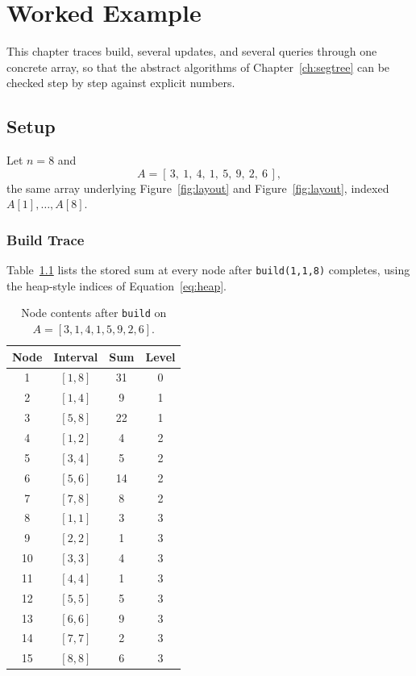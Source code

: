 \documentclass[
  11pt,
  a4paper,
  twoside=false,
  numbers=noenddot,
  headings=big,
  parskip=half,
  toc=bibliography,
  toc=listof,
  bibliography=totoc
]{scrreprt}
\newcounter{example}[chapter]
\newcommand{\tblhead}[1]{\textbf{\sffamily #1}}
\begin{document}
\chapter{Worked Example}
\label{ch:worked-example}

This chapter traces build, several updates, and several queries through one concrete array, so that the abstract algorithms of Chapter~\ref{ch:segtree} can be checked step by step against explicit numbers.

\section{Setup}
\label{sec:query-example}
Let $n=8$ and
\[
A = [\,3,\ 1,\ 4,\ 1,\ 5,\ 9,\ 2,\ 6\,],
\]
the same array underlying Figure~\ref{fig:layout} and Figure~\ref{fig:layout}, indexed $A[1],\dots,A[8]$.

\subsection{Build Trace}
Table~\ref{tab:build-trace} lists the stored sum at every node after \texttt{build(1,1,8)} completes, using the heap-style indices of Equation~\eqref{eq:heap}.

\begin{table}[h]
\centering
\caption{Node contents after \texttt{build} on $A=[3,1,4,1,5,9,2,6]$.}
\label{tab:build-trace}
\begin{tabular}{cccc}
\toprule
\tblhead{Node} & \tblhead{Interval} & \tblhead{Sum} & \tblhead{Level} \\
\midrule
1  & $[1,8]$ & 31 & 0 \\
2  & $[1,4]$ & 9  & 1 \\
3  & $[5,8]$ & 22 & 1 \\
4  & $[1,2]$ & 4  & 2 \\
5  & $[3,4]$ & 5  & 2 \\
6  & $[5,6]$ & 14 & 2 \\
7  & $[7,8]$ & 8  & 2 \\
8  & $[1,1]$ & 3  & 3 \\
9  & $[2,2]$ & 1  & 3 \\
10 & $[3,3]$ & 4  & 3 \\
11 & $[4,4]$ & 1  & 3 \\
12 & $[5,5]$ & 5  & 3 \\
13 & $[6,6]$ & 9  & 3 \\
14 & $[7,7]$ & 2  & 3 \\
15 & $[8,8]$ & 6  & 3 \\
\bottomrule
\end{tabular}
\end{table}
\end{document}
